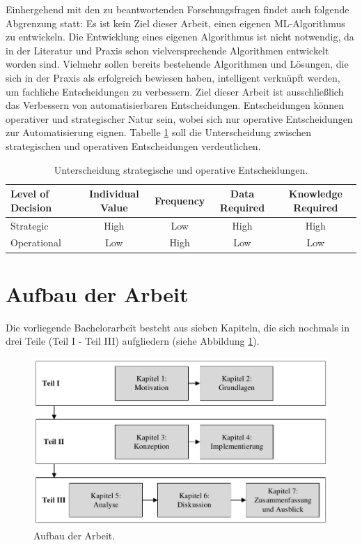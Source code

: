 Einhergehend mit den zu beantwortenden Forschungsfragen findet auch folgende Abgrenzung statt: Es ist kein Ziel dieser Arbeit, einen eigenen ML-Algorithmus zu entwickeln. Die Entwicklung eines eigenen Algorithmus ist nicht notwendig, da in der Literatur und Praxis schon vielversprechende Algorithmen entwickelt worden sind. Vielmehr sollen bereits bestehende Algorithmen und Lösungen, die sich in der Praxis als erfolgreich bewiesen haben, intelligent verknüpft werden, um fachliche Entscheidungen zu verbessern.  Ziel dieser Arbeit ist ausschließlich das Verbessern von automatisierbaren Entscheidungen. Entscheidungen können operativer und strategischer Natur sein, wobei sich nur operative Entscheidungen zur Automatisierung eignen. Tabelle \ref{tab:decisions} \cite[vgl. S. 9]{FT12} soll die Unterscheidung zwischen strategischen und operativen Entscheidungen verdeutlichen.  

\begin{table}[htb]
\centering
\small
\begin{tabular}{lcccc}
\toprule
Level of Decision &  Individual Value & Frequency & Data Required & Knowledge Required\\
\toprule
Strategic & High & Low & High & High\\\midrule
Operational & Low & High & Low & Low\\\bottomrule
\end{tabular}
\caption{Unterscheidung strategische und operative Entscheidungen.}
\label{tab:decisions}
\end{table}  
    
\section{Aufbau der Arbeit}
\label{sec:Aufbau_der_Arbeit1}

Die vorliegende Bachelorarbeit besteht aus sieben Kapiteln, die sich nochmals in drei Teile (Teil I - Teil III) aufgliedern (siehe Abbildung \ref{fig:Aufbau}).

\begin{figure}[ht]
\centering
\includegraphics{images/Aufbau.pdf}
\caption{Aufbau der Arbeit.}
\label{fig:Aufbau}
\end{figure}

